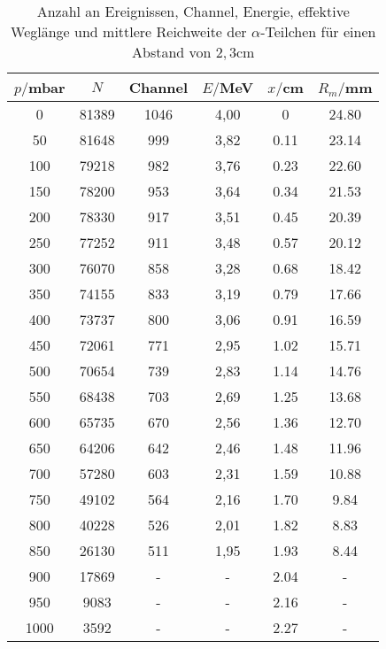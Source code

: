 \begin{table}[H]
  \centering
  \caption{Anzahl an Ereignissen, Channel, Energie, effektive Weglänge und mittlere Reichweite der $\alpha$-Teilchen für einen Abstand von $2,3$cm}
  \label{tab:Spannungsamplitude}
  \begin{tabular}{c c c c c c}
    \toprule
    $p/$mbar & $N$ & Channel & $E/$MeV & $x/$cm& $R_m/$mm \\
    \midrule
    0	  & 81389  &1046 &  4,00& 0     & 24.80         \\
    50	& 81648  & 999 &  3,82&  0.11  & 23.14        \\
    100 & 79218  & 982 &  3,76& 0.23  & 22.60        \\
    150 & 78200  & 953 &  3,64& 0.34  & 21.53        \\
    200 & 78330  & 917 &  3,51& 0.45  & 20.39        \\
    250 & 77252  & 911 &  3,48& 0.57  & 20.12        \\
    300 & 76070  & 858 &  3,28& 0.68  & 18.42        \\
    350 & 74155  & 833 &  3,19& 0.79  & 17.66        \\
    400 & 73737  & 800 &  3,06& 0.91  & 16.59        \\
    450 & 72061  & 771 &  2,95& 1.02  & 15.71        \\
    500 & 70654  & 739 &  2,83& 1.14  & 14.76        \\
    550 & 68438  & 703 &  2,69& 1.25  & 13.68        \\
    600 & 65735  & 670 &  2,56& 1.36  & 12.70        \\
    650 & 64206  & 642 &  2,46& 1.48  & 11.96        \\
    700 & 57280  & 603 &  2,31& 1.59  & 10.88        \\
    750 & 49102  & 564 &  2,16& 1.70  & 9.84        \\
    800 & 40228  & 526 &  2,01& 1.82  & 8.83        \\
    850 & 26130  & 511 &  1,95& 1.93  & 8.44        \\
    900 & 17869  &  -  & -    & 2.04  & -        \\
    950 & 9083	 &  -  & -    &  2.16  & -        \\
    1000& 3592   &  -  & -    & 2.27  & -        \\
    \bottomrule
  \end{tabular}
\end{table}





